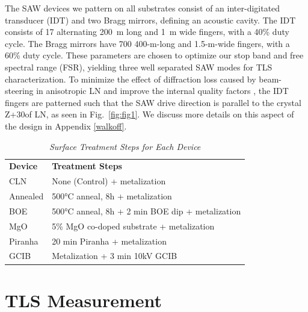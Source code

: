 \documentclass[
 prapplied,
 amsmath,amssymb,
 reprint, longbibliography, superscriptaddress
]{revtex4-2}
\begin{document}
The SAW devices we pattern on all substrates consist of an inter-digitated transducer (IDT) and two Bragg mirrors, defining an acoustic cavity. The IDT consists of 17 alternating 200~{\textmu}m long and 1~{\textmu}m wide fingers, with a 40\% duty cycle. The Bragg mirrors have 700 400-{\textmu}m-long and 1.5-{\textmu}m-wide fingers, with a 60\% duty cycle. These parameters are chosen to optimize our stop band and free spectral range (FSR), yielding three well separated SAW modes for TLS characterization. To minimize the effect of diffraction loss caused by beam-steering in anisotropic LN and improve the internal quality factors \cite{emser2022minimally}, the IDT fingers are patterned such that the SAW drive direction is parallel to the crystal Z+30\degree of LN, as seen in Fig.~\ref{fig:fig1}. We discuss more details on this aspect of the design in Appendix \ref{walkoff}.

\begin{table}[ht]
\caption{\emph{Surface Treatment Steps for Each Device}}
\centering
\begin{ruledtabular}
\begin{tabular}{l l}
\textbf{Device} & \textbf{Treatment Steps} \\
CLN & None (Control) + metalization \\
Annealed & 500°C anneal, 8h + metalization \\
BOE & 500°C anneal, 8h + 2 min BOE dip + metalization \\
MgO & 5\% MgO co-doped substrate + metalization \\
Piranha & 20 min Piranha + metalization\\
GCIB & Metalization + 3 min 10kV GCIB \\
\end{tabular}
\end{ruledtabular}
\end{table}

\section{TLS Measurement}
\end{document}
